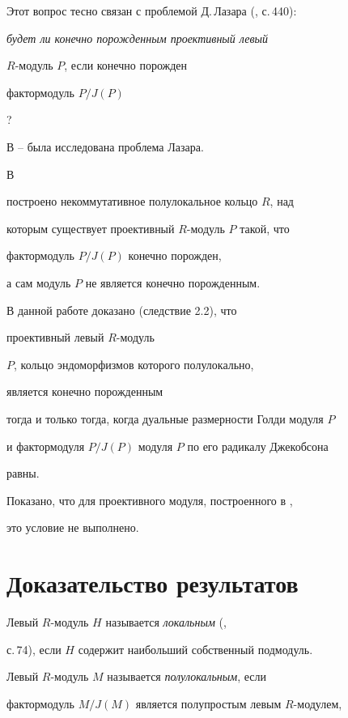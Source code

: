 Этот вопрос тесно связан с проблемой Д.\,Лазара (\cite{lazard}, с.\,440):


{\em будет ли конечно порожденным проективный левый 


$R$-модуль $P$, если конечно порожден


фактормодуль $P/J(P)$}? 


 


В \cite{zoeschinger81}--\cite{sakhaev93} была исследована проблема Лазара.


В \cite{gerasimov} 


построено некоммутативное полулокальное кольцо $R$, над 


которым существует проективный $R$-модуль $P$ такой, что


фактормодуль $P/J(P)$ конечно порожден, 


а сам модуль $P$ не является конечно порожденным.





В данной работе доказано (следствие 2.2), что 


проективный левый $R$-модуль 


$P$, кольцо эндоморфизмов которого полулокально, 


является конечно порожденным 


тогда и только тогда, когда дуальные размерности Голди модуля $P$


и фактормодуля $P/J(P)$ модуля $P$ по его радикалу Джекобсона 


равны.


Показано, что для проективного модуля, построенного в \cite{gerasimov}, 


это условие не выполнено.





\section{Доказательство результатов} 





Левый $R$-модуль $H$ называется {\em локальным} (\cite{faith}, 


с.\,74), если $H$ содержит наибольший собственный подмодуль. 


Левый $R$-модуль $M$ называется {\em полулокальным}, если


фактормодуль $M/ J(M)$ является полупростым левым $R$-модулем, 


